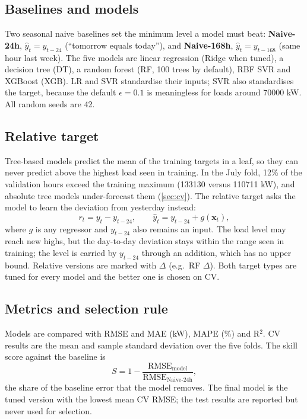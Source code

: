 \subsection{Baselines and models}
Two seasonal naive baselines set the minimum level a model must beat: \textbf{Naive-24h}, $\widehat y_t=y_{t-24}$ (``tomorrow equals today''), and \textbf{Naive-168h}, $\widehat y_t=y_{t-168}$ (same hour last week). The five models are linear regression (Ridge when tuned), a decision tree (DT), a random forest (RF, 100 trees by default), RBF SVR and XGBoost (XGB). LR and SVR standardise their inputs; SVR also standardises the target, because the default $\epsilon=0.1$ is meaningless for loads around \num{70000} kW. All random seeds are 42.

\subsection{Relative target}\label{sec:delta}
Tree-based models predict the mean of the training targets in a leaf, so they can never predict above the highest load seen in training. In the July fold, 12\% of the validation hours exceed the training maximum (\num{133130} versus \num{110711} kW), and absolute tree models under-forecast them (\cref{sec:cv}). The relative target asks the model to learn the deviation from yesterday instead:
\begin{equation}
r_t=y_t-y_{t-24},\qquad \widehat y_t=y_{t-24}+g(\mathbf x_t),
\label{eq:delta}
\end{equation}
where $g$ is any regressor and $y_{t-24}$ also remains an input. The load level may reach new highs, but the day-to-day deviation stays within the range seen in training; the level is carried by $y_{t-24}$ through an addition, which has no upper bound. Relative versions are marked with $\Delta$ (e.g.\ RF $\Delta$). Both target types are tuned for every model and the better one is chosen on CV.

\subsection{Metrics and selection rule}
Models are compared with RMSE and MAE (kW), MAPE (\%) and R$^2$. CV results are the mean and sample standard deviation over the five folds. The skill score against the baseline is
\begin{equation}
S=1-\frac{\mathrm{RMSE}_{\mathrm{model}}}{\mathrm{RMSE}_{\mathrm{Naive\text{-}24h}}},
\label{eq:skill}
\end{equation}
the share of the baseline error that the model removes. The final model is the tuned version with the lowest mean CV RMSE; the test results are reported but never used for selection.
